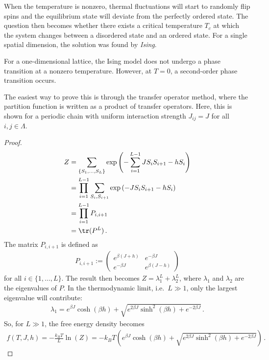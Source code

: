     When the temperature is nonzero, thermal fluctuations will start to randomly flip spins and the equilibrium state will deviate from the perfectly ordered state. The question then becomes whether there exists a critical temperature $T_c$ at which the system changes between a disordered state and an ordered state. For a single spatial dimension, the solution was found by \textit{Ising}.
    \begin{property}[$d=1$]
        For a one-dimensional lattice, the Ising model does not undergo a phase transition at a nonzero temperature. However, at $T=0$, a second-order phase transition occurs.

        The easiest way to prove this is through the transfer operator method, where the partition function is written as a product of transfer operators. Here, this is shown for a periodic chain with uniform interaction strength $J_{ij}=J$ for all $i,j\in\Lambda$.
        \begin{proof}
            \begin{align*}
                Z &= \sum_{\{S_1,\ldots,S_L\}}\exp\left(-\sum_{i=1}^{L-1}JS_iS_{i+1}-hS_i\right)\\
                &= \prod_{i=1}^{L-1}\sum_{S_i,S_{i+1}}\exp\left(-JS_iS_{i+1}-hS_i\right)\\
                &= \prod_{i=1}^{L-1}P_{i,i+1}\\
                &= \tr(P^L)\,.
            \end{align*}
            The matrix $P_{i,i+1}$ is defined as
            \begin{gather*}
                P_{i,i+1} :=
                \begin{pmatrix}
                    e^{\beta(J+h)}&e^{-\beta J}\\
                    e^{-\beta J}&e^{\beta(J-h)}
                \end{pmatrix}
            \end{gather*}
            for all $i\in\{1,\ldots,L\}$. The result then becomes $Z=\lambda^L_1+\lambda^L_2$, where $\lambda_1$ and $\lambda_2$ are the eigenvalues of $P$. In the thermodynamic limit, i.e.~$L\gg1$, only the largest eigenvalue will contribute:
            \begin{gather*}
                \lambda_1 = e^{\beta J}\cosh(\beta h) + \sqrt{e^{2\beta J}\sinh^2(\beta h)+e^{-2\beta J}}\,.
            \end{gather*}
            So, for $L\gg1$, the free energy density becomes
            \begin{gather*}
                f(T,J,h) = -\frac{k_BT}{L}\ln(Z) = -k_BT\left(e^{\beta J}\cosh(\beta h) + \sqrt{e^{2\beta J}\sinh^2(\beta h)+e^{-2\beta J}}\right)\,.
            \end{gather*}
    
        \end{proof}
    \end{property}

